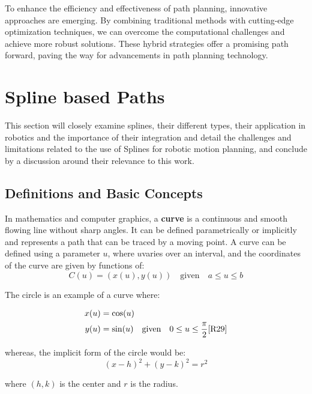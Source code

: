To enhance the efficiency and effectiveness of path planning, innovative approaches are emerging. 
By combining traditional methods with cutting-edge optimization techniques, we can overcome the 
computational challenges and achieve more robust solutions. These hybrid strategies offer a 
promising path forward, paving the way for advancements in path planning technology.


\newpage
\section{Spline based Paths}
This section will closely examine splines, their different types, their application in robotics and the 
importance of their integration and detail the challenges and limitations related to the use of Splines
for robotic motion planning, and conclude by a discussion around their relevance to this work.

\subsection{Definitions and Basic Concepts}

In mathematics and computer graphics, a \textbf{curve} is a continuous and smooth flowing line without sharp angles. 
It can be defined parametrically or implicitly and represents a path that can be traced by a moving point.
A curve can be defined using a parameter 
\(u\), where \(u\)varies over an interval, and the coordinates of the curve are given by functions of:
\begin{equation}
    C(u) = (x(u), y(u)) \quad \text{given} \quad a \leq u \leq b \label{eq:curve}
\end{equation}

The circle is an example of a curve where:

\hspace*{-1cm} %
\begin{align}
    x(u) &= \cos(u) \\
    y(u) &= \sin(u) \quad \text{given} \quad 0 \leq u \leq \frac{\pi}{2}     \cite{R29}
\end{align}

whereas, the implicit form of the circle would be:
\begin{equation}
    (x - h)^2 + (y - k)^2 = r^2
\end{equation}

where \((h,k)\) is the center and \(r\) is the radius.


